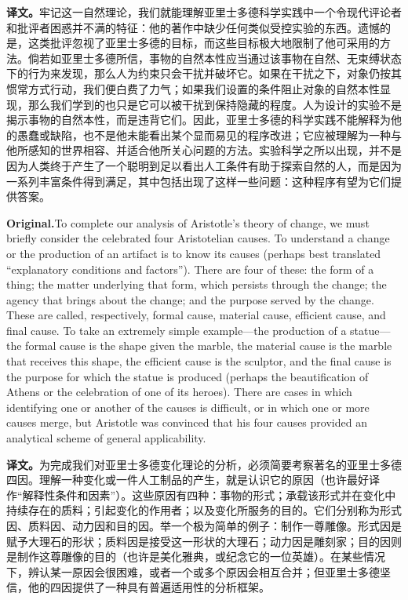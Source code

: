 \documentclass[UTF8]{ctexart}
\newcommand{\orig}{\par\noindent\textbf{Original.}\quad}
\newcommand{\zh}{\par\noindent\textbf{译文。}\quad}
\begin{document}
\zh 牢记这一自然理论，我们就能理解亚里士多德科学实践中一个令现代评论者和批评者困惑并不满的特征：他的著作中缺少任何类似受控实验的东西。遗憾的是，这类批评忽视了亚里士多德的目标，而这些目标极大地限制了他可采用的方法。倘若如亚里士多德所信，事物的自然本性应当通过该事物在自然、无束缚状态下的行为来发现，那么人为约束只会干扰并破坏它。如果在干扰之下，对象仍按其惯常方式行动，我们便白费了力气；如果我们设置的条件阻止对象的自然本性显现，那么我们学到的也只是它可以被干扰到保持隐藏的程度。人为设计的实验不是揭示事物的自然本性，而是违背它们。因此，亚里士多德的科学实践不能解释为他的愚蠢或缺陷，也不是他未能看出某个显而易见的程序改进；它应被理解为一种与他所感知的世界相容、并适合他所关心问题的方法。实验科学之所以出现，并不是因为人类终于产生了一个聪明到足以看出人工条件有助于探索自然的人，而是因为一系列丰富条件得到满足，其中包括出现了这样一些问题：这种程序有望为它们提供答案。

\orig To complete our analysis of Aristotle's theory of change, we must briefly consider the celebrated four Aristotelian causes. To understand a change or the production of an artifact is to know its causes (perhaps best translated ``explanatory conditions and factors''). There are four of these: the form of a thing; the matter underlying that form, which persists through the change; the agency that brings about the change; and the purpose served by the change. These are called, respectively, formal cause, material cause, efficient cause, and final cause. To take an extremely simple example---the production of a statue---the formal cause is the shape given the marble, the material cause is the marble that receives this shape, the efficient cause is the sculptor, and the final cause is the purpose for which the statue is produced (perhaps the beautification of Athens or the celebration of one of its heroes). There are cases in which identifying one or another of the causes is difficult, or in which one or more causes merge, but Aristotle was convinced that his four causes provided an analytical scheme of general applicability.

\zh 为完成我们对亚里士多德变化理论的分析，必须简要考察著名的亚里士多德四因。理解一种变化或一件人工制品的产生，就是认识它的原因（也许最好译作“解释性条件和因素”）。这些原因有四种：事物的形式；承载该形式并在变化中持续存在的质料；引起变化的作用者；以及变化所服务的目的。它们分别称为形式因、质料因、动力因和目的因。举一个极为简单的例子：制作一尊雕像。形式因是赋予大理石的形状；质料因是接受这一形状的大理石；动力因是雕刻家；目的因则是制作这尊雕像的目的（也许是美化雅典，或纪念它的一位英雄）。在某些情况下，辨认某一原因会很困难，或者一个或多个原因会相互合并；但亚里士多德坚信，他的四因提供了一种具有普遍适用性的分析框架。
\end{document}
